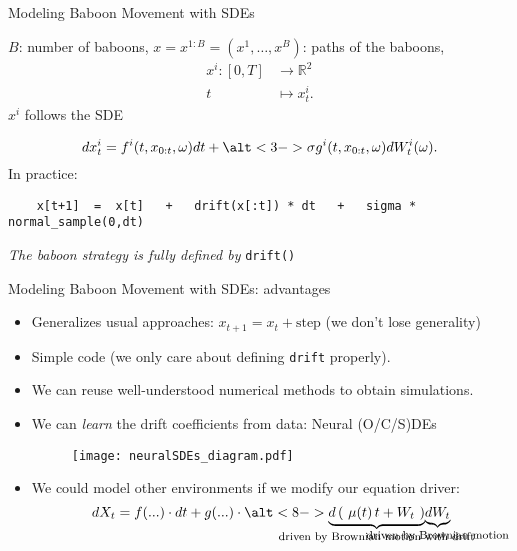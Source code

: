 \documentclass[
    aspectratio=169,
    10pt,
]{beamer}
\begin{document}
\begin{frame}[fragile]{Modeling Baboon Movement with SDEs}
    
        
    \(B\): number of baboons, \(x = x^{1:B} = (x^1, \dots, x^B)\): paths of the baboons,
    \begin{align*}
        x^i:[0, T] &\to \mathbb R^2\\
        t&\mapsto x^i_t.
    \end{align*} \pause
    \(    x^i    \) follows the SDE
    
    \begin{equation}
        dx^i_t = f^i(t, x_{0:t}, \omega) dt + \alt<3->{\sigma}{g^i(t, x_{0:t}, \omega)} dW^i_t(\omega).
    \end{equation}
    \pause
    In practice:
    \begin{verbatim}
    x[t+1]  =  x[t]   +   drift(x[:t]) * dt   +   sigma * normal_sample(0,dt)
    \end{verbatim}
    \pause
    \vspace{0.2cm}
    \begin{center} 
        \large
        \emph{The baboon strategy is fully defined by} {\texttt{drift()}}
    \end{center}
\end{frame}
\begin{frame}[fragile]{Modeling Baboon Movement with SDEs: advantages}
    \begin{itemize}
        \item Generalizes usual approaches: \(x_{t+1} = x_t + \text{step}\) (we don't lose generality)
        \pause
        \item Simple code \pause (we only care about defining \texttt{drift} properly).
        \pause 
        \item We can reuse well-understood numerical methods to obtain simulations.
        \pause 
        \item We can \emph{learn} the drift coefficients from data: Neural (O/C/S)DEs \cite{chen2019neuralordinarydifferentialequations, kidger2021neuralsdesinfinitedimensionalgans}
        \pause
        \begin{figure}
            \centering
            \texttt{[image: neuralSDEs\_diagram.pdf]}
        \end{figure}
        \pause
        \item We could model other environments if we modify our equation driver:
        \[
            dX_t = f(...) \cdot dt + g(...) \cdot 
            \alt<8->{\underbrace{d\left(\ \mu(t)\, t + W_t\ \right)}_{\makebox[0pt]{\footnotesize\text{driven by Brownian motion with drift}}}}{\underbrace{dW_t}_{\makebox[0pt]{\footnotesize\text{driven by Brownian motion}}}}
        \]
    \end{itemize}
\end{frame}
\end{document}
